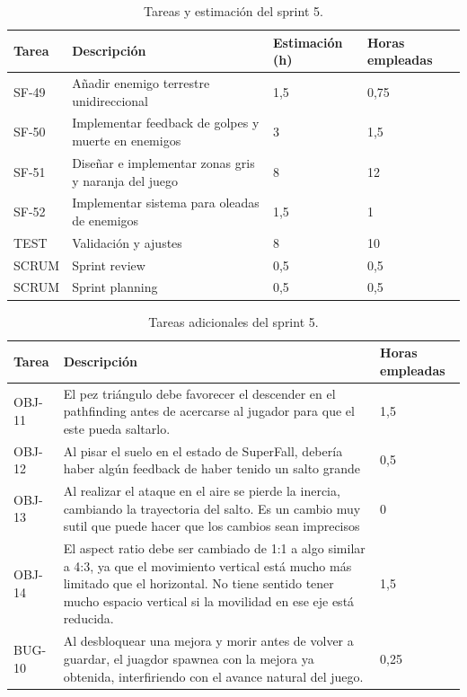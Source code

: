 \begin{table}[!ht]
    \centering
    \begin{tabular}{|l|p{8cm}|p{2cm}|p{2cm}|}
    \hline
        Tarea & Descripción & Estimación (h) & Horas empleadas \\ \hline
        SF-49 & Añadir enemigo terrestre unidireccional & 1,5 & 0,75 \\ \hline
        SF-50 & Implementar feedback de golpes y muerte en enemigos & 3 & 1,5 \\ \hline
        SF-51 & Diseñar e implementar zonas gris y naranja del juego & 8 & 12 \\ \hline
        SF-52 & Implementar sistema para oleadas de enemigos & 1,5 & 1 \\ \hline
        TEST & Validación y ajustes & 8 & 10 \\ \hline
        SCRUM & Sprint review & 0,5 & 0,5 \\ \hline
        SCRUM & Sprint planning & 0,5 & 0,5 \\ \hline
    \end{tabular}
    \caption{Tareas y estimación del sprint 5.}
    \label{tab:sprint5task}
\end{table}

\begin{table}[!ht]
    \centering
    \begin{tabular}{|l|p{8cm}|l|}
    \hline
        Tarea & Descripción & Horas empleadas \\ \hline
        OBJ-11 & El pez triángulo debe favorecer el descender en el pathfinding antes de acercarse al jugador para que el este pueda saltarlo. & 1,5 \\ \hline
        OBJ-12 & Al pisar el suelo en el estado de SuperFall, debería haber algún feedback de haber tenido un salto grande & 0,5 \\ \hline
        OBJ-13 & Al realizar el ataque en el aire se pierde la inercia, cambiando la trayectoria del salto. Es un cambio muy sutil que puede hacer que los cambios sean imprecisos & 0 \\ \hline
        OBJ-14 & El aspect ratio debe ser cambiado de 1:1 a algo similar a 4:3, ya que el movimiento vertical está mucho más limitado que el horizontal. No tiene sentido tener mucho espacio vertical si la movilidad en ese eje está reducida. & 1,5 \\ \hline
        BUG-10 & Al desbloquear una mejora y morir antes de volver a guardar, el juagdor spawnea con la mejora ya obtenida, interfiriendo con el avance natural del juego. & 0,25 \\ \hline
    \end{tabular}
    \caption{Tareas adicionales del sprint 5.}
    \label{tab:aditionalsprint5task}
\end{table}

